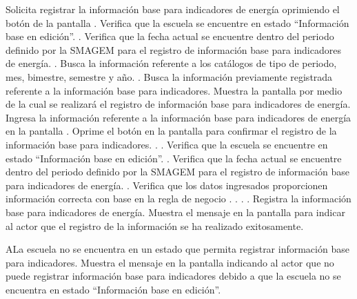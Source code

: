 \begin{UCtrayectoria}
    \UCpaso[\UCactor] Solicita registrar la información base para indicadores de energía oprimiendo el botón \botReg de la pantalla .
    \UCpaso[\UCsist] Verifica que la escuela se encuentre en estado ``Información base en edición''. .
    \UCpaso[\UCsist] Verifica que la fecha actual se encuentre dentro del periodo definido por la SMAGEM para el registro de información base para indicadores de energía. .
    \UCpaso[\UCsist] Busca la información referente a los catálogos de tipo de periodo, mes, bimestre, semestre y año. .
    \UCpaso[\UCsist] Busca la información previamente registrada referente a la información base para indicadores.
    \UCpaso[\UCsist] Muestra la pantalla  por medio de la cual se realizará el registro de información base para indicadores de energía.
    \UCpaso[\UCactor] Ingresa la información referente a la información base para indicadores de energía en la pantalla . \label{cuibe2:IngresarDatos}
    \UCpaso[\UCactor] Oprime el botón  en la pantalla  para confirmar el registro de la información base para indicadores. . .
    \UCpaso[\UCsist] Verifica que la escuela se encuentre en estado ``Información base en edición''. . \label{cuibe2:VerificarRegistro}    
    \UCpaso[\UCsist] Verifica que la fecha actual se encuentre dentro del periodo definido por la SMAGEM para el registro de información base para indicadores de energía. .
    \UCpaso[\UCsist] Verifica que los datos ingresados proporcionen información correcta con base en la regla de negocio . . . . 
    \UCpaso[\UCsist] Registra la información base para indicadores de energía.
    \UCpaso[\UCsist] Muestra el mensaje  en la pantalla  para indicar al actor que el registro de la información se ha realizado exitosamente.    
 \end{UCtrayectoria}
 
    \begin{UCtrayectoriaA}{A}{La escuela no se encuentra en un estado que permita registrar información base para indicadores.}
    \UCpaso[\UCsist] Muestra el mensaje  en la pantalla  indicando al actor que no puede registrar información base para indicadores debido a que la escuela no se encuentra en estado ``Información base en edición''. 
 \end{UCtrayectoriaA}

